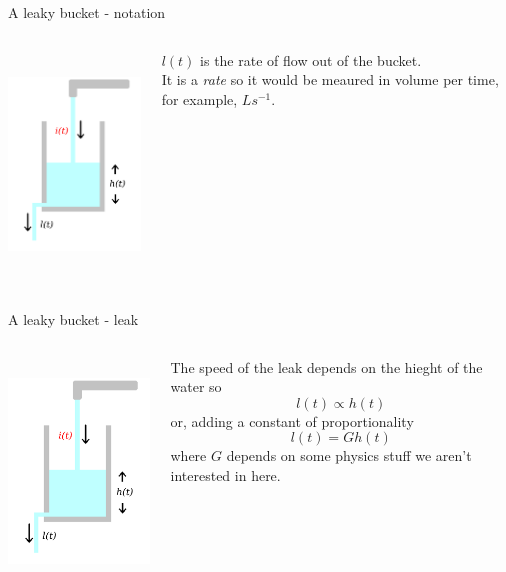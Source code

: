 \documentclass{beamer}
\newcommand{\crish}{\color{reddish}}
\newcommand{\cbla}{\color{black}}
\newcommand{\cred}{\color{red}}
\begin{document}
\begin{frame}{A leaky bucket - notation}
\begin{columns}
\begin{column}{0.5\textwidth}
  \begin{center}
     \includegraphics[height=6cm]{glass_i_red.png}      
     \end{center}
\end{column}
\begin{column}{0.5\textwidth}
  \cred{} $l(t)$\color{black}{} is the rate of flow out of the
  bucket.\\[1cm] It is a \textsl{rate} so it would be meaured in
  volume per time, for example, \crish$Ls^{-1}$\cbla.
  
\end{column}
\end{columns}
\end{frame}


\begin{frame}{A leaky bucket - leak}
\begin{columns}
\begin{column}{0.5\textwidth}
  \begin{center}
     \includegraphics[height=6cm]{glass_i_red.png}      
     \end{center}
\end{column}
\begin{column}{0.5\textwidth}
  The speed of the leak depends on the hieght of the water so\crish
  $$l(t)\propto h(t)$$
  \cbla{}or, adding a constant of proportionality\crish
  $$l(t)=Gh(t)$$
  \cbla{}where \crish{}$G$\cbla{} depends on some physics stuff we aren't interested in here.


  
\end{column}
\end{columns}
\end{frame}
\end{document}
